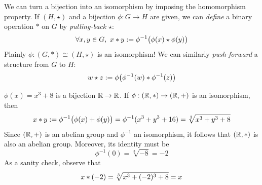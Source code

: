 

We can turn a bijection into an isomorphism by imposing the homomorphism property. If $(H,\star)$ and a bijection $\phi:G\to H$ are given, we can \emph{define} a binary operation $\ast$ on $G$ by \emph{pulling-back} $\star$:
\[\forall x,y\in G,\ x\mathbin{\ast} y:=\phi^{-1}\bigl(\phi(x)\mathbin{\star}\phi(y)\bigr)\]
Plainly $\phi:(G,*)\cong(H,\star)$ is an isomorphism!
We can similarly \emph{push-forward} a structure from $G$ to $H$:
\[w\mathbin{\star} z:=\phi\bigl(\phi^{-1}(w)\mathbin{\ast}\phi^{-1}(z)\bigr)\]

\begin{example}{}{}
  $\phi(x)=x^3+8$ is a bijection $\mathbb{R}\to\mathbb{R}$. If $\phi:(\mathbb{R},*)\to(\mathbb{R},+)$ is an isomorphism, then
	\[x\mathbin{\ast} y:=\phi^{-1}\bigl(\phi(x)+\phi(y)\bigr)=\phi^{-1}(x^3+y^3+16)=\sqrt[3]{x^3+y^3+8}\]
	Since $(\mathbb{R},+)$ is an abelian group and $\phi^{-1}$ an isomorphism, it follows that $(\mathbb{R},*)$ is also an abelian group. Moreover, its identity must be
	\[\phi^{-1}(0)=\sqrt[3]{-8}=-2\]
	As a sanity check, observe that
	\[x\mathbin{\ast} (-2)=\sqrt[3]{x^3+(-2)^3+8}=x\]
\end{example}




